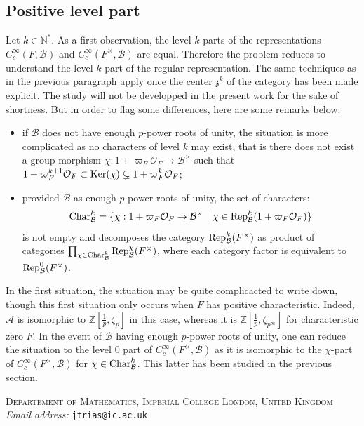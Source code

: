 \documentclass[11pt]{article}
\theoremstyle{plain}
\theoremstyle{definition}
\theoremstyle{plain}
\theoremstyle{definition}
\theoremstyle{plain}
\begin{document}
\subsection{Positive level part}

Let $k \in \mathbb{N}^*$. As a first observation, the level $k$ parts of the representations $C_c^\infty(F,\mathcal{B})$ and $C_c^\infty(F^\times,\mathcal{B})$ are equal. Therefore the problem reduces to understand the level $k$ part of the regular representation. The same techniques as in the previous paragraph apply once the center $\mathfrak{z}^k$ of the category has been made explicit. The study will not be developped in the present work for the sake of shortness. But in order to flag some differences, here are some remarks below:
\begin{itemize}
\item if $\mathcal{B}$ does not have enough $p$-power roots of unity, the situation is more complicated as no characters of level $k$ may exist, that is there does not exist a group morphism $ \chi : 1 + \varpi_F \mathcal{O}_F \to \mathcal{B}^\times$ such that $1 + \varpi_F^{k+1} \mathcal{O}_F \subset \textup{Ker}(\chi) \subsetneq 1 + \varpi_F^k \mathcal{O}_F$;
\item provided $\mathcal{B}$ as enough $p$-power roots of unity, the set of characters: 
$$\textup{Char}_\mathcal{B}^k = \{ \chi : 1 + \varpi_F \mathcal{O}_F \to \mathcal{B}^\times \ | \ \chi \in \textup{Rep}_\mathcal{B}^k(1+\varpi_F \mathcal{O}_F) \}$$
is not empty and decomposes the category $\textup{Rep}_\mathcal{B}^k(F^\times)$ as product of categories $\prod_{\chi \in \textup{Char}_\mathcal{B}^k} \textup{Rep}_\mathcal{B}^\chi(F^\times)$, where each category factor is equivalent to $\textup{Rep}_\mathcal{B}^0(F^\times)$.
\end{itemize}
In the first situation, the situation may be quite complicacted to write down, though this first situation only occurs when $F$ has positive characteristic. Indeed, $\mathcal{A}$ is isomorphic to $\mathbb{Z}[\frac{1}{p},\zeta_p]$ in this case, whereas it is $\mathbb{Z}[\frac{1}{p},\zeta_{p^\infty}]$ for characteristic zero $F$. In the event of $\mathcal{B}$ having enough $p$-power roots of unity, one can reduce the situation to the level $0$ part of $C_c^\infty(F^\times,\mathcal{B})$ as it is isomorphic to the $\chi$-part of $C_c^\infty(F^\times,\mathcal{B})$ for $\chi \in \textup{Char}_\mathcal{B}^k$. This latter has been studied in the previous section.





\noindent \textsc{Departement of Mathematics, Imperial College London, United Kingdom} \\
\textit{Email address:} \texttt{jtrias@ic.ac.uk}
\end{document}
